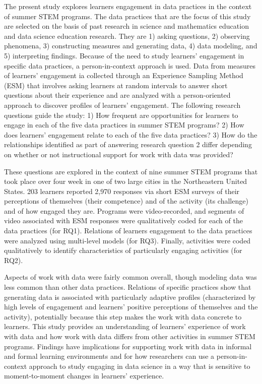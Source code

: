 \documentclass[]{book}
\theoremstyle{definition}
\theoremstyle{definition}
\theoremstyle{definition}
\theoremstyle{remark}
\begin{document}
The present study explores learners engagement in data practices in the
context of summer STEM programs. The data practices that are the focus
of this study are selected on the basis of past research in science and
mathematics education and data science education research. They are 1)
asking questions, 2) observing phenomena, 3) constructing measures and
generating data, 4) data modeling, and 5) interpreting findings. Because
of the need to study learners' engagement in specific data practices, a
person-in-context approach is used. Data from measures of learners'
engagement ia collected through an Experience Sampling Method (ESM) that
involves asking learners at random intervals to answer short questions
about their experience and are analyzed with a person-oriented approach
to discover profiles of learners' engagement. The following research
questions guide the study: 1) How frequent are opportunities for
learners to engage in each of the five data practices in summer STEM
programs? 2) How does learners' engagement relate to each of the five
data practices? 3) How do the relationships identified as part of
answering research question 2 differ depending on whether or not
instructional support for work with data was provided?

These questions are explored in the context of nine summer STEM programs
that took place over four week in one of two large cities in the
Northeastern United States. 203 learners reported 2,970 responses via
short ESM surveys of their perceptions of themselves (their competence)
and of the activity (its challenge) and of how engaged they are.
Programs were video-recorded, and segments of video associated with ESM
responses were qualitatively coded for each of the data practices (for
RQ1). Relations of learners engagement to the data practices were
analyzed using multi-level models (for RQ3). Finally, activities were
coded qualitatively to identify characteristics of particularly engaging
activities (for RQ2).

Aspects of work with data were fairly common overall, though modeling
data was less common than other data practices. Relations of specific
practices show that generating data is associated with particularly
adaptive profiles (characterized by high levels of engagement and
learners' positive perceptions of themselves and the activity),
potentially because this step makes the work with data concrete to
learners. This study provides an understanding of learners' experience
of work with data and how work with data differs from other activities
in summer STEM programs. Findings have implications for supporting work
with data in informal and formal learning environments and for how
researchers can use a person-in-context approach to study engaging in
data science in a way that is sensitive to moment-to-moment changes in
learners' experience.
\end{document}
